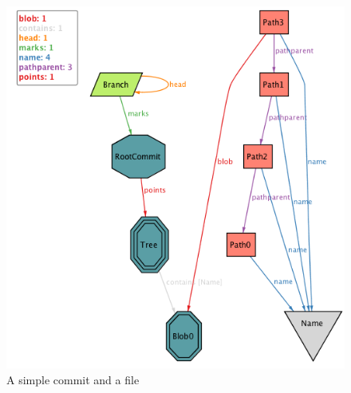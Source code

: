 \begin{figure}[h!]
	\caption{A simple commit and a file}
  \centering
    \includegraphics[scale=0.65]{images/image2.png}
\end{figure}

